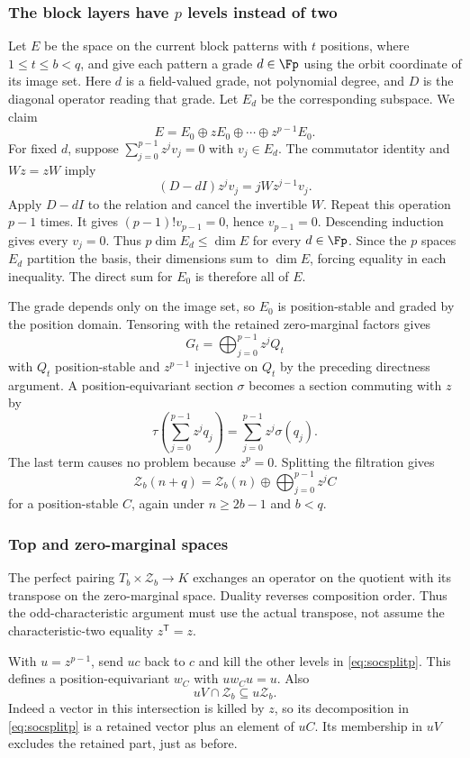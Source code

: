 \subsubsection{The block layers have \texorpdfstring{$p$}{p} levels instead of two}
Let $E$ be the space on the current block patterns with $t$ positions, where $1\le t\le b<q$, and give each pattern a grade $d\in\Fp$ using the orbit coordinate of its image set. Here $d$ is a field-valued grade, not polynomial degree, and $D$ is the diagonal operator reading that grade. Let $E_d$ be the corresponding subspace. We claim
\[E=E_0\oplus zE_0\oplus\cdots\oplus z^{p-1}E_0.
\]
For fixed $d$, suppose $\sum_{j=0}^{p-1}z^jv_j=0$ with $v_j\in E_d$. The commutator identity and $Wz=zW$ imply
\[(D-dI)z^jv_j=jWz^{j-1}v_j.
\]
Apply $D-dI$ to the relation and cancel the invertible $W$. Repeat this operation $p-1$ times. It gives $(p-1)!v_{p-1}=0$, hence $v_{p-1}=0$. Descending induction gives every $v_j=0$. Thus $p\dim E_d\le\dim E$ for every $d\in\Fp$. Since the $p$ spaces $E_d$ partition the basis, their dimensions sum to $\dim E$, forcing equality in each inequality. The direct sum for $E_0$ is therefore all of $E$.

The grade depends only on the image set, so $E_0$ is position-stable and graded by the position domain. Tensoring with the retained zero-marginal factors gives
\[G_t=\bigoplus_{j=0}^{p-1}z^jQ_t
\]
with $Q_t$ position-stable and $z^{p-1}$ injective on $Q_t$ by the preceding directness argument. A position-equivariant section $\sigma$ becomes a section commuting with $z$ by
\[\tau\left(\sum_{j=0}^{p-1}z^jq_j\right)=\sum_{j=0}^{p-1}z^j\sigma(q_j).
\]
The last term causes no problem because $z^p=0$. Splitting the filtration gives
\begin{equation}\label{eq:socsplitp}
\mathcal Z_b(n+q)=\mathcal Z_b(n)\oplus\bigoplus_{j=0}^{p-1}z^jC
\end{equation}
for a position-stable $C$, again under $n\ge2b-1$ and $b<q$.

\subsubsection{Top and zero-marginal spaces}
The perfect pairing $T_b\times\mathcal Z_b\to K$ exchanges an
operator on the quotient with its transpose on the zero-marginal
space. Duality reverses composition order. Thus the odd-characteristic
argument must use the actual transpose, not assume the
characteristic-two equality $z^{\mathsf T}=z$.

With $u=z^{p-1}$, send $uc$ back to $c$ and kill the other levels in \eqref{eq:socsplitp}. This defines a position-equivariant $w_C$ with $uw_Cu=u$. Also
\[uV\cap \mathcal Z_b\subseteq u\mathcal Z_b.
\]
Indeed a vector in this intersection is killed by $z$, so its decomposition in \eqref{eq:socsplitp} is a retained vector plus an element of $uC$. Its membership in $uV$ excludes the retained part, just as before.

